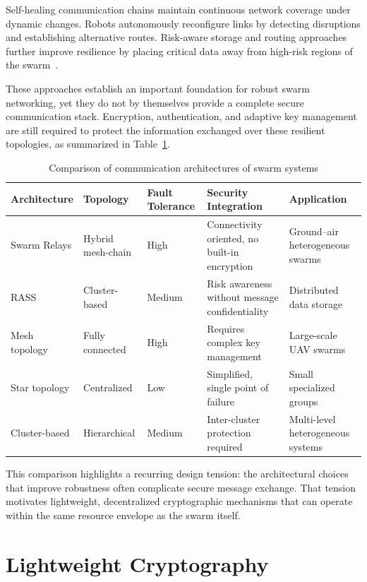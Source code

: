 Self-healing communication chains maintain continuous network coverage under dynamic changes. Robots autonomously reconfigure links by detecting disruptions and establishing alternative routes. Risk-aware storage and routing approaches further improve resilience by placing critical data away from high-risk regions of the swarm~\cite{arseneaultRASSRiskAwareSwarm2022}.

These approaches establish an important foundation for robust swarm networking, yet they do not by themselves provide a complete secure communication stack. Encryption, authentication, and adaptive key management are still required to protect the information exchanged over these resilient topologies, as summarized in Table~\ref{tab:comm_arch_comparison}.

\begin{table}[H]
\centering
\caption{Comparison of communication architectures of swarm systems}
\label{tab:comm_arch_comparison}
\scriptsize
\renewcommand{\arraystretch}{1.14}
\begin{tabularx}{\textwidth}{|p{2.2cm}|p{2.4cm}|p{2.0cm}|X|p{2.5cm}|}
\hline
\textbf{Architecture} & \textbf{Topology} & \textbf{Fault Tolerance} & \textbf{Security Integration} & \textbf{Application} \\
\hline
Swarm Relays & Hybrid mesh-chain & High & Connectivity oriented, no built-in encryption & Ground--air heterogeneous swarms \\
\hline
RASS & Cluster-based & Medium & Risk awareness without message confidentiality & Distributed data storage \\
\hline
Mesh topology & Fully connected & High & Requires complex key management & Large-scale UAV swarms \\
\hline
Star topology & Centralized & Low & Simplified, single point of failure & Small specialized groups \\
\hline
Cluster-based & Hierarchical & Medium & Inter-cluster protection required & Multi-level heterogeneous systems \\
\hline
\end{tabularx}
\end{table}

This comparison highlights a recurring design tension: the architectural choices that improve robustness often complicate secure message exchange. That tension motivates lightweight, decentralized cryptographic mechanisms that can operate within the same resource envelope as the swarm itself.

\section{Lightweight Cryptography}
\label{sec:lightweight_crypto}

